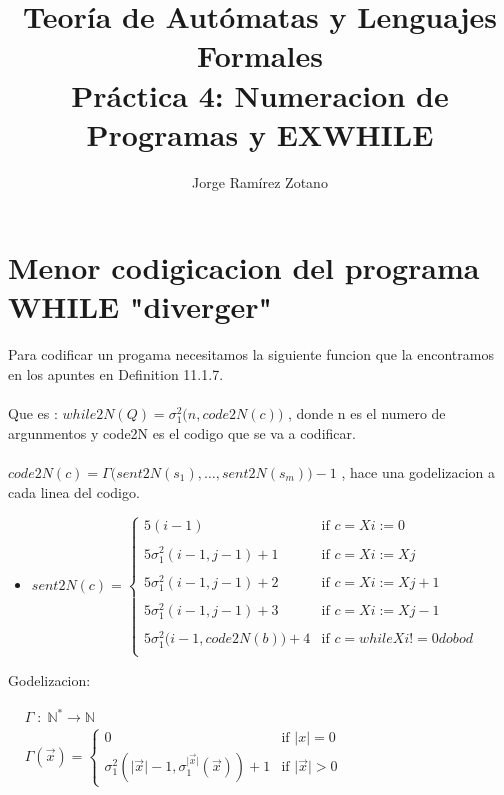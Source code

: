 \documentclass[a4paper]{article}
\title{Teoría de Autómatas y Lenguajes Formales\\[.4\baselineskip]Práctica 4: Numeracion de Programas y EXWHILE}
\author{Jorge Ramírez Zotano}
\theoremstyle{definition}
\newcommand{\card}[1]{\ensuremath{\lvert #1 \rvert}}
\begin{document}
\maketitle
                                                                                                                                
\section{Menor codigicacion del programa WHILE "diverger" }
Para codificar un progama necesitamos la siguiente funcion que la encontramos en los apuntes en Definition 11.1.7.\\ 
\\ 
Que es : $while2N(Q) = \sigma^2_1\bigl(n, code2N(c)\bigl) $ , donde n es el numero de argunmentos y code2N es el codigo que se va a codificar. \\\\
$code2N(c)=\Gamma\bigl(sent2N(s_1),\dots,sent2N(s_m)\bigl)-1$ , hace una godelizacion a cada linea del codigo.\\
\begin{itemize}
\item $sent2N(c)=\left\{
  \begin{array}{ll}
    5(i-1)                                    & \text{if } c= Xi:=0            \\
    \\ 5\sigma_1^2(i-1,j-1)+1                 & \text{if } c= Xi:=Xj      \\
    \\ 5\sigma_1^2(i-1,j-1)+2                 & \text{if } c= Xi:=Xj+1      \\
    \\ 5\sigma_1^2(i-1,j-1)+3                 & \text{if } c= Xi:=Xj-1   \\
    \\ 5\sigma_1^2\bigl(i-1,code2N(b)\bigl)+4 & \text{if } c= while Xi !=0 do b od \\
  \end{array} \right.$
\end{itemize}
Godelizacion:
\\ 
\begin{center}
$\begin{aligned}
&\Gamma \;:\; \mathbb{N}^* \to \mathbb{N}\\
&\Gamma(\vec{x}) = 
\begin{cases}
 0                         & \text{if } |x| = 0\\
 \sigma^2_1 \left(\card{\vec{x}}-1, \sigma^{\card{\vec{x}}}_1(\vec{x}) \right)+1 & \text{if } \card{\vec{x}} > 0
\end{cases}
\end{aligned}$
\end{center}
\end{document}
